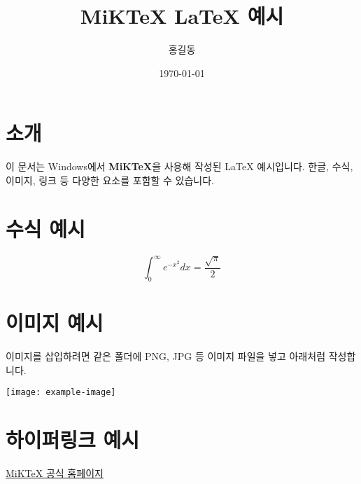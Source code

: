 \documentclass[12pt]{article}
\title{MiKTeX LaTeX 예시}
\author{홍길동}
\date{\today}
\begin{document}
\maketitle

\tableofcontents
\newpage

\section{소개}
이 문서는 Windows에서 \textbf{MiKTeX}을 사용해 작성된 LaTeX 예시입니다.  
한글, 수식, 이미지, 링크 등 다양한 요소를 포함할 수 있습니다.

\section{수식 예시}
\[
\int_{0}^{\infty} e^{-x^2} dx = \frac{\sqrt{\pi}}{2}
\]

\section{이미지 예시}
이미지를 삽입하려면 같은 폴더에 PNG, JPG 등 이미지 파일을 넣고 아래처럼 작성합니다.

\begin{center}
\texttt{[image: example-image]}
\end{center}

\section{하이퍼링크 예시}
\href{https://www.miktex.org}{MiKTeX 공식 홈페이지}
\end{document}
